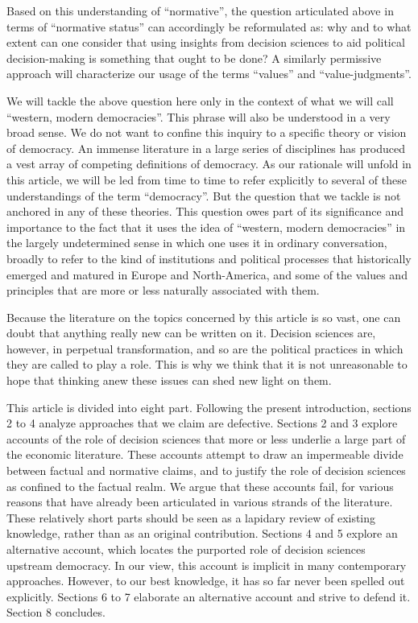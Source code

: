 \documentclass[preprint,11pt]{elsarticle}
\begin{document}
Based on this understanding of ``normative'', the question articulated above in terms of ``normative status'' can accordingly be reformulated as: why and to what extent can one consider that using insights from decision sciences to aid political decision-making is something that ought to be done? A similarly permissive approach will characterize our usage of the terms ``values'' and ``value-judgments''.

We will tackle the above question here only in the context of what we will call ``western, modern democracies''. This phrase will also be understood in a very broad sense. We do not want to confine this inquiry to a specific theory or vision of democracy. An immense literature in a large series of disciplines has produced a vest array of competing definitions of democracy. As our rationale will unfold in this article, we will be led from time to time to refer explicitly to several of these understandings of the term ``democracy''. But the question that we tackle is not anchored in any of these theories. This question owes part of its significance and importance to the fact that it uses the idea of “western, modern democracies” in the largely undetermined sense in which one uses it in ordinary conversation, broadly to refer to the kind of institutions and political processes that historically emerged and matured in Europe and North-America, and some of the values and principles that are more or less naturally associated with them.

Because the literature on the topics concerned by this article is so vast, one can doubt that anything really new can be written on it. Decision sciences are, however, in perpetual transformation, and so are the political practices in which they are called to play a role. This is why we think that it is not unreasonable to hope that thinking anew these issues can shed new light on them.

This article is divided into eight part. Following the present introduction, sections 2 to 4 analyze approaches that we claim are defective. Sections 2 and 3 explore accounts of the role of decision sciences that more or less underlie a large part of the economic literature. These accounts attempt to draw an impermeable divide between factual and normative claims, and to justify the role of decision sciences as confined to the factual realm. We argue that these accounts fail, for various reasons that have already been articulated in various strands of the literature. These relatively short parts should be seen as a lapidary review of existing knowledge, rather than as an original contribution. Sections 4 and 5 explore an alternative account, which locates the purported role of decision sciences upstream democracy. In our view, this account is implicit in many contemporary approaches. However, to our best knowledge, it has so far never been spelled out explicitly. Sections 6 to 7 elaborate an alternative account and strive to defend it. Section 8 concludes.
\end{document}
